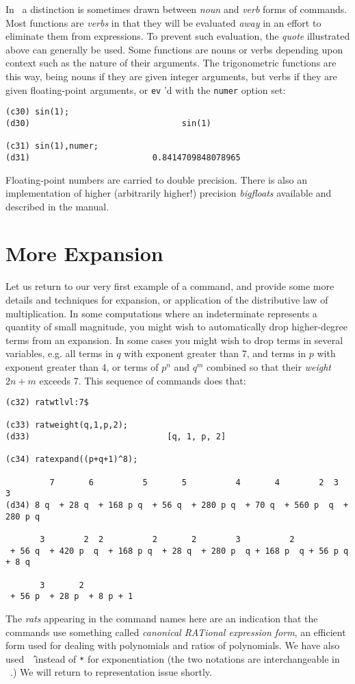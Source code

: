 In \Max\ a distinction is sometimes
drawn between {\it noun} and {\it verb} forms of commands.
Most functions are {\it verbs} in that they will be evaluated {\it away} in
an effort to eliminate them from expressions.
To prevent such evaluation, the {\it quote} illustrated
above can generally be
used.  Some functions are nouns or verbs depending upon context such as the nature of
their arguments. The trigonometric functions are this way, being nouns
if they are given integer arguments, but verbs if they are given
floating-point arguments, or {\tt ev}
'd with the {\tt numer}
option set:
\begin{verbatim}
(c30) sin(1);
(d30)                               sin(1)

(c31) sin(1),numer;
(d31)                         0.8414709848078965
\end{verbatim}
Floating-point numbers are carried to double precision.
There is also an implementation of higher (arbitrarily higher!) precision {\it bigfloats} available
and described in the manual.

\section{More Expansion}

Let us return to our very first example of a command,
and provide some more details and techniques for expansion, or
application of the distributive law of multiplication.  In some
computations where an indeterminate represents a quantity of small magnitude,
you might wish to automatically drop higher-degree terms from an expansion.
In some cases you might wish to drop terms in several variables, e.g.
all terms in $q$ with exponent
greater than 7, and terms in $p$ with exponent greater than 4, or
terms of $p^n $ and $q^m $ combined so that their {\it weight} $2 n + m$
exceeds 7.  This sequence of commands does that:
{\footnotesize
\begin{verbatim}
(c32) ratwtlvl:7$

(c33) ratweight(q,1,p,2);
(d33)                            [q, 1, p, 2]

(c34) ratexpand((p+q+1)^8);

         7       6          5       5          4       4        2  3          3
(d34) 8 q  + 28 q  + 168 p q  + 56 q  + 280 p q  + 70 q  + 560 p  q  + 280 p q

       3        2  2          2       2        3          2
 + 56 q  + 420 p  q  + 168 p q  + 28 q  + 280 p  q + 168 p  q + 56 p q + 8 q

       3       2
 + 56 p  + 28 p  + 8 p + 1

\end{verbatim}}
The {\it rats} appearing in the command names
here are an indication that the commands use something called
{\it canonical RATional expression form},
an efficient form used for dealing with polynomials and ratios of
polynomials. We have also used {\tt \^\ } instead of {\tt **} for exponentiation (the two notations
are interchangeable in \Max\ .) We will return to representation issue shortly.

